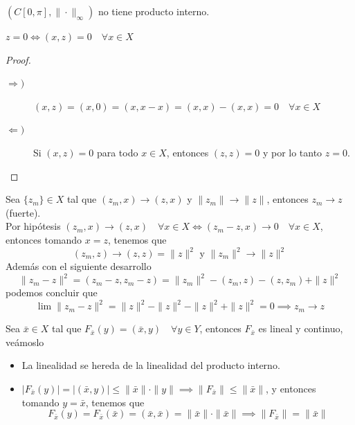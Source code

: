 \begin{ejercicio}
    $(C[0,\pi], \|\cdot\|_{\infty})$ no tiene producto interno. \\
\end{ejercicio}

\begin{prop}
    $z = 0 \iff (x, z) = 0 \quad \forall x \in X$\\

\begin{proof}
    \begin{description}
        \item[$\Longrightarrow)$] $(x, z) =(x,0)= (x,x-x) = (x, x) - (x, x) = 0 \quad \forall x \in X$
        \item[$\Longleftarrow)$] Si $(x, z) = 0$ para todo $x \in X$, entonces $(z, z) = 0$ y por lo tanto $z = 0$.
    \end{description}
\end{proof}
\end{prop}

\begin{ejercicio}
    Sea $\{z_m\} \in X$ tal que $(z_m, x) \longrightarrow (z, x)$ y $\|z_m\| \longrightarrow \|z\|$, entonces $z_m \to z$ (fuerte). \\

    \noindent
    Por hipótesis $(z_m, x) \longrightarrow (z, x) \quad \forall x \in X \iff (z_m - z, x) \longrightarrow 0 \quad \forall x \in X$, entonces tomando $x=z$, tenemos que
    $$(z_m, z) \to (z, z) = \|z\|^2 \text{ y } \|z_m\|^2 \to \|z\|^2$$
    Además con el siguiente desarrollo
    $$\|z_m - z\|^2 = (z_m - z, z_m - z) = \|z_m\|^2 - (z_m, z) - (z, z_m) + \|z\|^2$$
    podemos concluir que 
    $$\lim \|z_m - z\|^2 = \|z\|^2 - \|z\|^2 - \|z\|^2 + \|z\|^2 = 0 \implies z_m \to z$$
\end{ejercicio}

\begin{observacion}
    Sea $\bar{x}\in X$ tal que $F_{\bar{x}}(y) = (\bar{x}, y) \quad \forall y \in Y$, entonces $F_{\bar{x}}$ es lineal y continuo, veámoslo
    \begin{itemize}
        \item La linealidad se hereda de la linealidad del producto interno.
        \item $|F_{\bar{x}}(y)| = |(\bar{x}, y)| \le \|\bar{x}\| \cdot \|y\| \implies \|F_{\bar{x}}\| \le \|\bar{x}\|$, y entonces tomando $y = \bar{x}$, tenemos que
        $$F_{\bar{x}}(y) = F_{\bar{x}}(\bar{x}) = (\bar{x}, \bar{x}) = \|\bar{x}\| \cdot \|\bar{x}\| \implies \|F_{\bar{x}}\| = \|\bar{x}\|$$
    \end{itemize}
\end{observacion}


